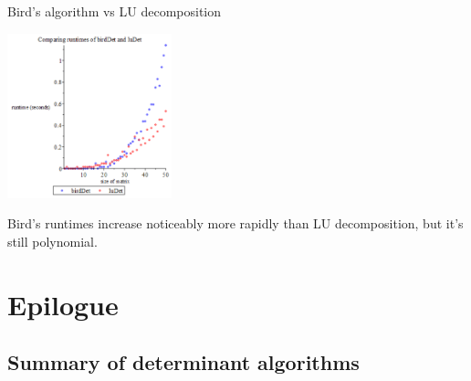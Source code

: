 \documentclass{beamer}
\begin{document}
\begin{frame}{Bird's algorithm vs LU decomposition}

    \begin{center}{}
        \includegraphics[height=180]{bird-lu}
    \end{center}

    Bird's runtimes increase noticeably more rapidly than LU decomposition,
    but it's still polynomial.

\end{frame}

\section{Epilogue}

\subsection{Summary of determinant algorithms}
\end{document}
